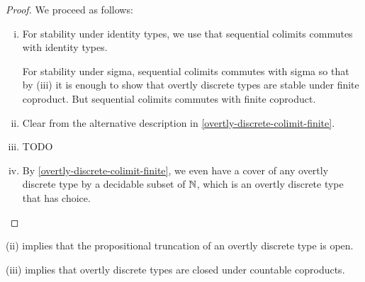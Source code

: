 \begin{proof}
We proceed as follows:
\begin{enumerate}[(i)]
\item For stability under identity types, we use that sequential colimits commutes with identity types. 

For stability under sigma, sequential colimits commutes with sigma so that by (iii) it is enough to show that overtly discrete types are stable under finite coproduct. But sequential colimits commutes with finite coproduct.

\item Clear from the alternative description in \cref{overtly-discrete-colimit-finite}.

\item TODO

\item By \cref{overtly-discrete-colimit-finite}, we even have a cover of any overtly discrete type by a decidable subset of $\mathbb{N}$, which is an overtly discrete type that has choice.
\end{enumerate}
\end{proof}

\begin{remark}
(ii) implies that the propositional truncation of an overtly discrete type is open.

(iii) implies that overtly discrete types are closed under countable coproducts.
\end{remark}